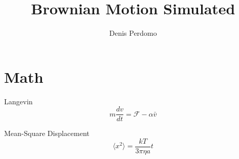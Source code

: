 \documentclass[12pt,a4paper]{article}  %
\title{Brownian Motion Simulated}
\author{Denis Perdomo}
\begin{document}
    \maketitle


    \section{Math}

    Langevin
    \[m \frac{dv}{dt} = \mathcal{F} - \alpha \bar v\]

    \noindent
    Mean-Square Displacement
    \[\langle x^2 \rangle = \frac{kT}{3 \pi \eta a} t\]
\end{document}
